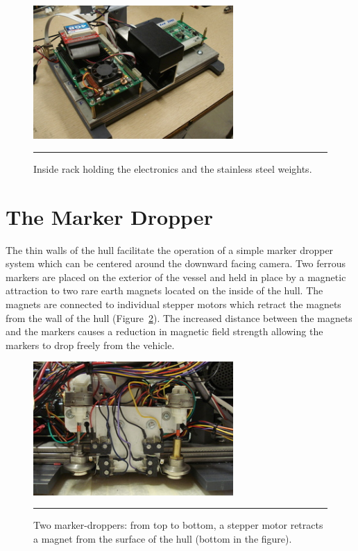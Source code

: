 \begin{figure}
\begin{center}
 \includegraphics[width=3in]{fig/dsc06466} 
\vspace{.05in}
\hrule
\caption{Inside rack holding the electronics and the stainless steel weights.}\label{rack}
\end{center}
\end{figure}


\section{The Marker Dropper}
\label{mdroppers}

The thin walls of the hull facilitate the operation of a simple marker dropper system which
can be centered around the downward facing camera.  Two ferrous
markers are placed on the exterior of the vessel and held in place by
a magnetic attraction to two rare earth magnets located on the inside
of the hull.  The magnets are connected to individual stepper motors
which retract the magnets from the wall of the hull (Figure~\ref{md2}).  The increased
distance between the magnets and the markers causes a reduction in
magnetic field strength allowing the markers to drop freely from the
vehicle.

\begin{figure}
\begin{center}
 \includegraphics[width=3in]{fig/dsc06468} 
\vspace{.05in}
\hrule
\caption{Two marker-droppers: from top to bottom, a stepper motor
  retracts a magnet from the surface of the hull (bottom in the figure).}\label{md2}
\end{center}
\end{figure}

